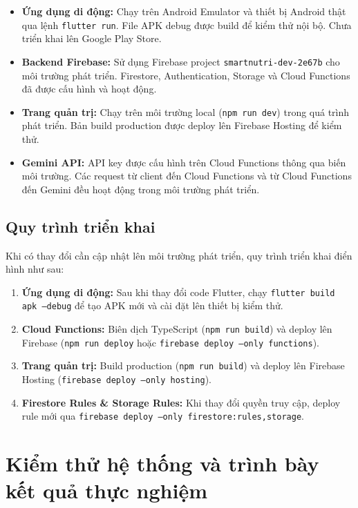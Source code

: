 \begin{itemize}
    \item \textbf{Ứng dụng di động:} Chạy trên Android Emulator và thiết bị Android thật qua lệnh \texttt{flutter run}. File APK debug được build để kiểm thử nội bộ. Chưa triển khai lên Google Play Store.
    \item \textbf{Backend Firebase:} Sử dụng Firebase project \texttt{smartnutri-dev-2e67b} cho môi trường phát triển. Firestore, Authentication, Storage và Cloud Functions đã được cấu hình và hoạt động.
    \item \textbf{Trang quản trị:} Chạy trên môi trường local (\texttt{npm run dev}) trong quá trình phát triển. Bản build production được deploy lên Firebase Hosting để kiểm thử.
    \item \textbf{Gemini API:} API key được cấu hình trên Cloud Functions thông qua biến môi trường. Các request từ client đến Cloud Functions và từ Cloud Functions đến Gemini đều hoạt động trong môi trường phát triển.
\end{itemize}

\subsection{Quy trình triển khai}

Khi có thay đổi cần cập nhật lên môi trường phát triển, quy trình triển khai điển hình như sau:

\begin{enumerate}
    \item \textbf{Ứng dụng di động:} Sau khi thay đổi code Flutter, chạy \texttt{flutter build apk --debug} để tạo APK mới và cài đặt lên thiết bị kiểm thử.
    \item \textbf{Cloud Functions:} Biên dịch TypeScript (\texttt{npm run build}) và deploy lên Firebase (\texttt{npm run deploy} hoặc \texttt{firebase deploy --only functions}).
    \item \textbf{Trang quản trị:} Build production (\texttt{npm run build}) và deploy lên Firebase Hosting (\texttt{firebase deploy --only hosting}).
    \item \textbf{Firestore Rules \& Storage Rules:} Khi thay đổi quyền truy cập, deploy rule mới qua \texttt{firebase deploy --only firestore:rules,storage}.
\end{enumerate}

\section{Kiểm thử hệ thống và trình bày kết quả thực nghiệm}

